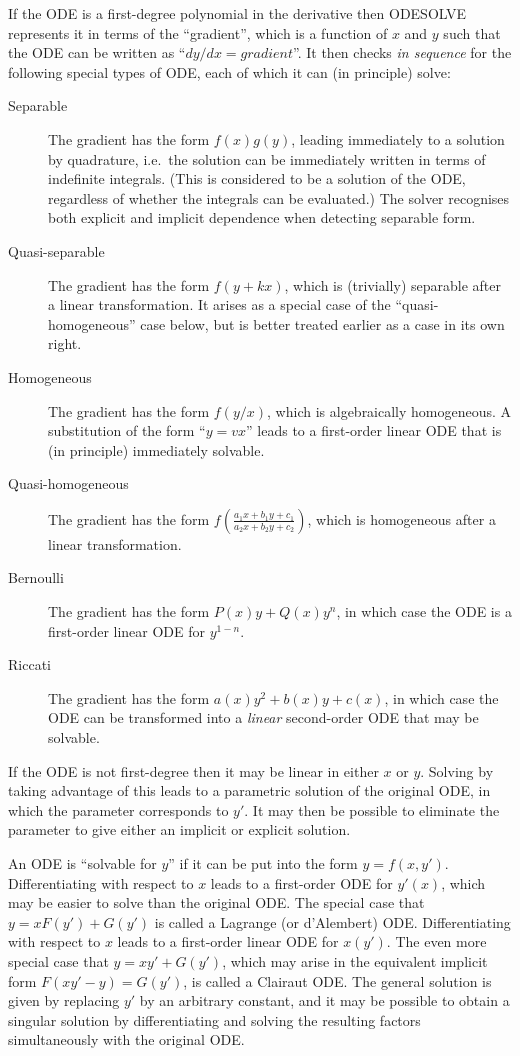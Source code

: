 If the ODE is a first-degree polynomial in the derivative then
ODESOLVE represents it in terms of the ``gradient'', which is a
function of $x$ and $y$ such that the ODE can be written as ``$dy/dx =
\textit{gradient}$''.  It then checks \emph{in sequence} for the
following special types of ODE, each of which it can (in principle)
solve:
\begin{description}
\item[Separable] The gradient has the form $f(x)g(y)$, leading
immediately to a solution by quadrature, i.e.\ the solution can be
immediately written in terms of indefinite integrals.  (This is
considered to be a solution of the ODE, regardless of whether the
integrals can be evaluated.)  The solver recognises both explicit and
implicit dependence when detecting separable form.

\item[Quasi-separable] The gradient has the form $f(y+kx)$, which is
(trivially) separable after a linear transformation.  It arises as a
special case of the ``quasi-homogeneous'' case below, but is better
treated earlier as a case in its own right.

\item[Homogeneous] The gradient has the form $f(y/x)$, which is
algebraically homogeneous.  A substitution of the form ``$y = vx$''
leads to a first-order linear ODE that is (in principle) immediately
solvable.

\item[Quasi-homogeneous] The gradient has the form $f\left(\frac{a_1x
  + b_1y + c_1}{a_2x + b_2y + c_2}\right)$, which is homogeneous after
  a linear transformation.

\item[Bernoulli] The gradient has the form $P(x) y + Q(x) y^n$, in
which case the ODE is a first-order linear ODE for $y^{1-n}$.

\item[Riccati] The gradient has the form $a(x)y^2 + b(x)y + c(x)$, in
which case the ODE can be transformed into a \emph{linear}
second-order ODE that may be solvable.
\end{description}

If the ODE is not first-degree then it may be linear in either $x$ or
$y$.  Solving by taking advantage of this leads to a parametric
solution of the original ODE, in which the parameter corresponds to
$y'$.  It may then be possible to eliminate the parameter to give
either an implicit or explicit solution.

An ODE is ``solvable for $y$'' if it can be put into the form $y =
f(x,y')$.  Differentiating with respect to $x$ leads to a first-order
ODE for $y'(x)$, which may be easier to solve than the original ODE.
The special case that $y = xF(y') + G(y')$ is called a Lagrange (or
d'Alembert) ODE\@.  Differentiating with respect to $x$ leads to a
first-order linear ODE for $x(y')$.  The even more special case that
$y = x y' + G(y')$, which may arise in the equivalent implicit form
$F(xy'-y) = G(y')$, is called a Clairaut ODE\@.  The general solution is
given by replacing $y'$ by an arbitrary constant, and it may be
possible to obtain a singular solution by differentiating and solving
the resulting factors simultaneously with the original ODE.


